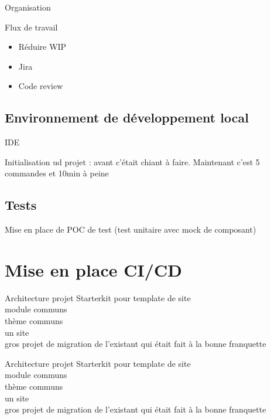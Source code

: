 \begin{frame}{Organisation}
	\begin{block}{Flux de travail}
		\begin{itemize}
			\item Réduire WIP
			\item Jira
			\item Code review
		\end{itemize}
	\end{block}

\end{frame}

\subsection[Développement]{Environnement de développement local}
\begin{frame}{\subsecname}
	IDE
	
	Initialisation ud projet : avant c'était chiant à faire. Maintenant c'est 5 commandes et 10min à peine
\end{frame}

\subsection{Tests}
\begin{frame}{\subsecname}
	Mise en place de POC de test (test unitaire avec mock de composant)
	
\end{frame}

\section{Mise en place CI/CD}
\begin{frame}{Architecture projet}
	Starterkit pour template de site
	 \\
	 module communs
	 \\
	 thème communs
	 \\
	 un site 
	 \\ gros projet de migration de l'existant qui était fait à la bonne franquette
\end{frame}

\begin{frame}{Architecture projet}
	Starterkit pour template de site
	\\
	module communs
	\\
	thème communs
	\\
	un site 
	\\ gros projet de migration de l'existant qui était fait à la bonne franquette
\end{frame}
